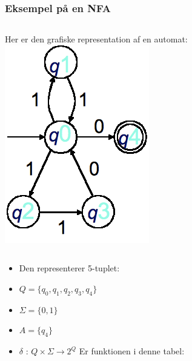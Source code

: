 \newcommand{\sarrow}[1]{\overset{#1}{\rightarrow}}

\begin{frame}
\frametitle{Eksempel på en NFA}
\begin{columns}
\column{9cm}Her er den grafiske representation af en automat:
\column{3cm}\includegraphics[scale=0.3]{images/2_seminar_quiz_NFA}
\end{columns}
\begin{itemize}[<+->]
  \item Den representerer 5-tuplet:
  \item $Q=\{q_0,q_1,q_2,q_3,q_4\}$
  \item $\Sigma = \{0,1\}$
  \item $A=\{q_4\}$
  \item
      $\delta$ : $Q\times \Sigma \rightarrow 2^Q$ Er funktionen i
      denne tabel: 

  \end{itemize}
\end{frame}
